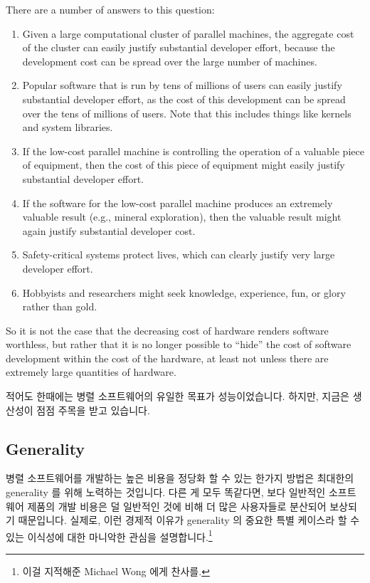 {	There are a number of answers to this question:
	\begin{enumerate}
	\item	Given a large computational cluster of parallel machines,
		the aggregate cost of the cluster can easily justify
		substantial developer effort, because the development
		cost can be spread over the large number of machines.
	\item	Popular software that is run by tens of millions of users
		can easily justify substantial developer effort,
		as the cost of this development can be spread over the tens
		of millions of users.
		Note that this includes things like kernels and system
		libraries.
	\item	If the low-cost parallel machine is controlling the operation
		of a valuable piece of equipment, then the cost of this
		piece of equipment might easily justify substantial
		developer effort.
	\item	If the software for the low-cost parallel machine produces an
		extremely valuable result (e.g., mineral exploration),
		then the valuable result might again justify substantial
		developer cost.
	\item	Safety-critical systems protect lives, which can clearly
		justify very large developer effort.
	\item	Hobbyists and researchers might seek knowledge, experience,
		fun, or glory rather than gold.
	\end{enumerate}
	So it is not the case that the decreasing cost of hardware renders
	software worthless, but rather that it is no longer possible to
	``hide'' the cost of software development within the cost of
	the hardware, at least not unless there are extremely large
	quantities of hardware.
\fi
} \QuickQuizEnd

적어도 한때에는 병렬 소프트웨어의 유일한 목표가 성능이었습니다.
하지만, 지금은 생산성이 점점 주목을 받고 있습니다.

\subsection{Generality}
\label{sec:intro:Generality}

병렬 소프트웨어를 개발하는 높은 비용을 정당화 할 수 있는 한가지 방법은 최대한의
generality 를 위해 노력하는 것입니다.
다른 게 모두 똑같다면, 보다 일반적인 소프트웨어 제품의 개발 비용은 덜 일반적인
것에 비해 더 많은 사용자들로 분산되어 보상되기 때문입니다.
실제로, 이런 경제적 이유가 generality 의 중요한 특별 케이스라 할 수 있는
이식성에 대한 마니악한 관심을 설명합니다.\footnote{
	이걸 지적해준 Michael Wong 에게 찬사를.}
\iffalse

